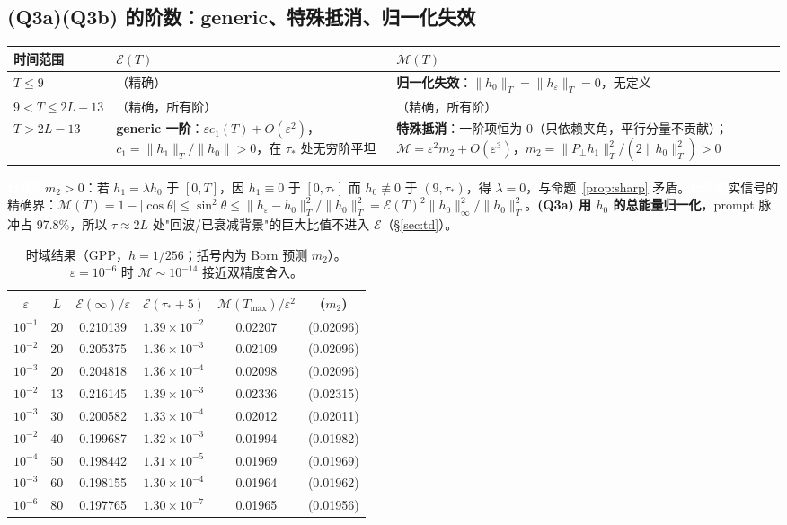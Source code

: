 \documentclass[11pt,a4paper,fontset=windows]{ctexart}
\newcommand{\tagbox}[2]{\begingroup\setlength{\fboxsep}{1.4pt}\colorbox{#1}{\textcolor{white}{\footnotesize\bfseries #2}}\endgroup}
\newcommand{\proven}{\tagbox{green!45!black}{已证明}}
\theoremstyle{definition}
\theoremstyle{definition}
\newcommand{\eps}{\varepsilon}
\newcommand{\cE}{\mathcal E}
\newcommand{\cM}{\mathcal M}
\newcommand{\tauS}{\tau_*}
\begin{document}
\subsection{(Q3a)(Q3b) 的阶数：generic、特殊抵消、归一化失效}
\begin{table}[h]
\centering\small
\begin{tabularx}{\textwidth}{@{}l>{\raggedright\arraybackslash}X>{\raggedright\arraybackslash}X@{}}
\toprule
时间范围 & $\cE(T)$ & $\cM(T)$\\\midrule
$T\le9$ & 0（精确） & \textbf{归一化失效}：$\|h_0\|_T=\|h_\eps\|_T=0$，无定义\\
$9<T\le2L-13$ & 0（精确，所有阶） & 0（精确，所有阶）\\
$T>2L-13$ & \textbf{generic 一阶}：$\eps c_1(T)+O(\eps^2)$，$c_1=\|h_1\|_T/\|h_0\|>0$，在 $\tauS$ 处无穷阶平坦 & \textbf{特殊抵消}：一阶项恒为 0（只依赖夹角，平行分量不贡献）；$\cM=\eps^2m_2+O(\eps^3)$，$m_2=\|P_\perp h_1\|_T^2/(2\|h_0\|_T^2)>0$\\\bottomrule
\end{tabularx}
\end{table}
\proven\enspace $m_2>0$：若 $h_1=\lambda h_0$ 于 $[0,T]$，因 $h_1\equiv0$ 于 $[0,\tauS]$ 而 $h_0\not\equiv0$ 于 $(9,\tauS)$，得 $\lambda=0$，与命题~\ref{prop:sharp} 矛盾。\proven\enspace 实信号的精确界：$\cM(T)=1-|\cos\theta|\le\sin^2\theta\le\|h_\eps-h_0\|_T^2/\|h_0\|_T^2=\cE(T)^2\|h_0\|_\infty^2/\|h_0\|_T^2$。\textbf{(Q3a) 用 $h_0$ 的总能量归一化}，prompt 脉冲占 97.8\%，所以 $\tau\approx2L$ 处"回波/已衰减背景"的巨大比值不进入 $\cE$（\S\ref{sec:td}）。

\begin{table}[h]
\centering\small
\caption{时域结果（GPP，$h=1/256$；括号内为 Born 预测 $m_2$）。$\eps=10^{-6}$ 时 $\cM\sim10^{-14}$ 接近双精度舍入。}\label{tab:td}
\begin{tabular}{@{}cccccc@{}}
\toprule
$\eps$ & $L$ & $\cE(\infty)/\eps$ & $\cE(\tauS+5)$ & $\cM(T_{\max})/\eps^2$ & ($m_2$)\\\midrule
$10^{-1}$ & 20 & 0.210139 & $1.39\times10^{-2}$ & 0.02207 & (0.02096)\\
$10^{-2}$ & 20 & 0.205375 & $1.36\times10^{-3}$ & 0.02109 & (0.02096)\\
$10^{-3}$ & 20 & 0.204818 & $1.36\times10^{-4}$ & 0.02098 & (0.02096)\\
$10^{-2}$ & 13 & 0.216145 & $1.39\times10^{-3}$ & 0.02336 & (0.02315)\\
$10^{-3}$ & 30 & 0.200582 & $1.33\times10^{-4}$ & 0.02012 & (0.02011)\\
$10^{-2}$ & 40 & 0.199687 & $1.32\times10^{-3}$ & 0.01994 & (0.01982)\\
$10^{-4}$ & 50 & 0.198442 & $1.31\times10^{-5}$ & 0.01969 & (0.01969)\\
$10^{-3}$ & 60 & 0.198155 & $1.30\times10^{-4}$ & 0.01964 & (0.01962)\\
$10^{-6}$ & 80 & 0.197765 & $1.30\times10^{-7}$ & 0.01965 & (0.01956)\\\bottomrule
\end{tabular}
\end{table}
\end{document}
